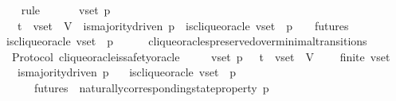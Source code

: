 \begin{isabellebody}
%
\isadelimproof
\ \ %
\endisadelimproof
%
\isatagproof
{}\isamarkupfalse%
\ {\isacharparenleft}rule{\isacharplus}{\isacharparenright}\isanewline
{}\isamarkupfalse%
\ {\isacharminus}\isanewline
\ \ \isamarkupfalse%
\ {\isasymsigma}\ v{\isacharunderscore}set\ p\ {\isasymsigma}{\isacharprime}\isanewline
\ \ \isamarkupfalse%
\ {\isachardoublequoteopen}{\isasymsigma}\ {\isasymin}\ {\isasymSigma}t\ {\isasymand}\ v{\isacharunderscore}set\ {\isasymsubseteq}\ V{\isachardoublequoteclose}\ \ {\isachardoublequoteopen}is{\isacharunderscore}majority{\isacharunderscore}driven\ p{\isachardoublequoteclose}\ \ {\isachardoublequoteopen}is{\isacharunderscore}clique{\isacharunderscore}oracle\ {\isacharparenleft}v{\isacharunderscore}set{\isacharcomma}\ {\isasymsigma}{\isacharcomma}\ p{\isacharparenright}{\isachardoublequoteclose}\ \ {\isachardoublequoteopen}{\isasymsigma}{\isacharprime}\ {\isasymin}\ futures\ {\isasymsigma}{\isachardoublequoteclose}\ \isanewline
\ \ \isamarkupfalse%
\ {\isachardoublequoteopen}is{\isacharunderscore}clique{\isacharunderscore}oracle\ {\isacharparenleft}v{\isacharunderscore}set{\isacharcomma}\ {\isasymsigma}{\isacharprime}{\isacharcomma}\ p{\isacharparenright}{\isachardoublequoteclose}\isanewline
\ \ \ \ \isamarkupfalse%
\ clique{\isacharunderscore}oracles{\isacharunderscore}preserved{\isacharunderscore}over{\isacharunderscore}minimal{\isacharunderscore}transitions\isanewline
\ \ \isamarkupfalse%
\isanewline
{}\isamarkupfalse%
%
\endisatagproof
{\isafoldproof}%
%
\isadelimproof
\isanewline
%
\endisadelimproof
\isanewline
\isanewline
{}\isamarkupfalse%
\ {\isacharparenleft}\ Protocol{\isacharparenright}\ clique{\isacharunderscore}oracle{\isacharunderscore}is{\isacharunderscore}safety{\isacharunderscore}oracle\ {\isacharcolon}\isanewline
\ \ {\isachardoublequoteopen}{\isasymforall}\ {\isasymsigma}\ v{\isacharunderscore}set\ p{\isachardot}\ {\isasymsigma}\ {\isasymin}\ {\isasymSigma}t\ {\isasymand}\ v{\isacharunderscore}set\ {\isasymsubseteq}\ V\ \isanewline
\ \ {\isasymlongrightarrow}\ finite\ v{\isacharunderscore}set\isanewline
\ \ {\isasymlongrightarrow}\ is{\isacharunderscore}majority{\isacharunderscore}driven\ p\isanewline
\ \ {\isasymlongrightarrow}\ is{\isacharunderscore}clique{\isacharunderscore}oracle\ {\isacharparenleft}v{\isacharunderscore}set{\isacharcomma}\ {\isasymsigma}{\isacharcomma}\ p{\isacharparenright}\ \isanewline
\ \ {\isasymlongrightarrow}\ {\isacharparenleft}{\isasymforall}\ {\isasymsigma}{\isacharprime}\ {\isasymin}\ futures\ {\isasymsigma}{\isachardot}\ naturally{\isacharunderscore}corresponding{\isacharunderscore}state{\isacharunderscore}property\ p\ {\isasymsigma}{\isacharprime}{\isacharparenright}{\isachardoublequoteclose}\ \ \ \ \isanewline

\end{isabellebody}
